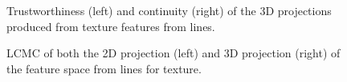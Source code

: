 \begin{figure}[H]
	\centering
	\caption{Trustworthiness (left) and continuity (right) of the 3D projections produced from texture features from lines.}\label{fig:TC_3d_texture}
\end{figure}

\begin{figure}[H]
	\centering
	\caption{LCMC of both the 2D projection (left) and 3D projection (right) of the feature space from lines for texture.}\label{fig:LCMC_texture}
\end{figure}
\clearpage


